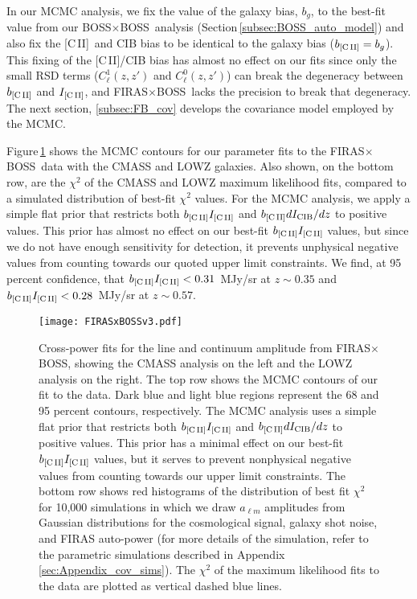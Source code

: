 \documentclass[fleqn,usenatbib]{mnras}
\newcommand{\cii}{[C{\sc\,II}]}
\newcommand{\BB}{BOSS${\times}$BOSS}
\newcommand{\FB}{FIRAS${\times}$BOSS}
\begin{document}
In our MCMC analysis, we fix the value of the galaxy bias, $b_g$, to the best-fit value from our \BB\ analysis (Section\,\ref{subsec:BOSS_auto_model}) and also fix the \cii\ and CIB bias to be identical to the galaxy bias ($b_{\rm \cii}=b_g$). This fixing of the \cii/CIB bias has almost no effect on our fits since only the small RSD terms ($C^1_{\ell}(z,z')$ and $C^0_{\ell}(z,z')$) can break the degeneracy between $b_{\rm \cii}$ and $I_{\rm \cii}$, and \FB\ lacks the precision to break that degeneracy. The next section, \ref{subsec:FB_cov} develops the covariance model employed by the MCMC.

Figure\,\ref{fig:cross_power_fits} shows the MCMC contours for our parameter fits to the \FB\ data with the CMASS and LOWZ galaxies. Also shown, on the bottom row, are the $\chi^2$ of the CMASS and LOWZ maximum likelihood fits, compared to a simulated distribution of best-fit $\chi^2$ values. For the MCMC analysis, we apply a simple flat prior that restricts both $b_{\rm \cii}I_{\rm \cii}$ and $b_{\rm \cii}dI_{\rm CIB}/dz$ to positive values. This prior has almost no effect on our best-fit $b_{\rm \cii}I_{\rm \cii}$ values, but since we do not have enough sensitivity for detection, it prevents unphysical negative values from counting towards our quoted upper limit constraints. We find, at 95 percent confidence, that $b_{\rm \cii}I_{\rm \cii}<0.31$\, MJy/sr at $z\sim0.35$ and $b_{\rm \cii}I_{\rm \cii}<0.28$\, MJy/sr at $z\sim0.57$. 

\begin{figure}
  \texttt{[image: FIRASxBOSSv3.pdf]}
  \caption{Cross-power fits for the line and continuum amplitude from \FB, showing the CMASS analysis on the left and the LOWZ analysis on the right. The top row shows the MCMC contours of our fit to the data. Dark blue and light blue regions represent the 68 and 95 percent contours, respectively.  The MCMC analysis uses a simple flat prior that restricts both $b_{\rm \cii}I_{\rm \cii}$ and $b_{\rm \cii}dI_{\rm CIB}/dz$ to positive values. This prior has a minimal effect on our best-fit $b_{\rm \cii}I_{\rm \cii}$ values, but it serves to prevent nonphysical negative values from counting towards our upper limit constraints. The bottom row shows red histograms of the distribution of best fit $\chi^2$ for 10,000 simulations in which we draw $a_{\ell m}$ amplitudes from Gaussian distributions for the cosmological signal, galaxy shot noise, and FIRAS auto-power (for more details of the simulation, refer to the parametric simulations described in Appendix\,\ref{sec:Appendix_cov_sims}). The $\chi^2$ of the maximum likelihood fits to the data are plotted as vertical dashed blue lines.}
  \label{fig:cross_power_fits}
\end{figure}
\end{document}

